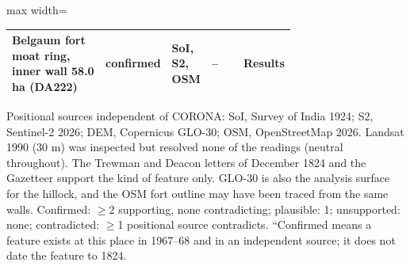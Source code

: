 \begin{table}[!htbp]
\begin{adjustbox}{max width=\linewidth}
\begin{tabular}{>{\raggedright\arraybackslash}p{0.42\linewidth}l>{\raggedright\arraybackslash}p{0.14\linewidth}>{\raggedright\arraybackslash}p{0.15\linewidth}l}
Belgaum fort moat ring, inner wall 58.0 ha (DA222) & confirmed & SoI, S2, OSM & -- & Results \\
\bottomrule
\end{tabular}
\end{adjustbox}
\par\smallskip\parbox{\linewidth}{\scriptsize Positional sources independent of CORONA: SoI, Survey of India 1924; S2, Sentinel-2 2026; DEM, Copernicus GLO-30; OSM, OpenStreetMap 2026. Landsat 1990 (30 m) was inspected but resolved none of the readings (neutral throughout). The Trewman and Deacon letters of December 1824 and the Gazetteer support the kind of feature only. GLO-30 is also the analysis surface for the hillock, and the OSM fort outline may have been traced from the same walls. Confirmed: $\geq$2 supporting, none contradicting; plausible: 1; unsupported: none; contradicted: $\geq$1 positional source contradicts. ``Confirmed means a feature exists at this place in 1967--68 and in an independent source; it does not date the feature to 1824.}
\end{table}
